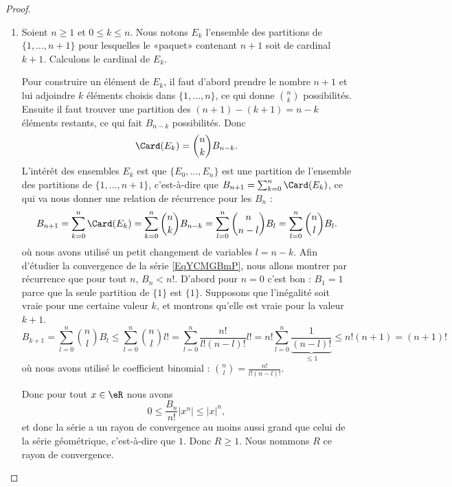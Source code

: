 \begin{proof}
	\begin{enumerate}
		\item
		      Soient \( n\geq 1\) et \( 0\leq k\leq n\). Nous notons \( E_k\) l'ensemble des partitions de \( \{ 1,\ldots, n+1 \}\) pour lesquelles le «paquet» contenant \( n+1\) soit de cardinal \( k+1\). Calculons le cardinal de \( E_k\).

		      Pour construire un élément de \( E_k\), il faut d'abord prendre le nombre \( n+1\) et lui adjoindre \( k\) éléments choisis dans \( \{ 1,\ldots, n \}\), ce qui donne \( n\choose k\) possibilités. Ensuite il faut trouver une partition des \( (n+1)-(k+1)=n-k\) éléments restants, ce qui fait \( B_{n-k}\) possibilités. Donc
		      \begin{equation}
			      \Card(E_k)={n\choose k}B_{n-k}.
		      \end{equation}
		      L'intérêt des ensembles \( E_k\) est que \( \{ E_0,\ldots, E_n \}\) est une partition de l'ensemble des partitions de \( \{ 1,\ldots, n+1 \}\), c'est-à-dire que \( B_{n+1}=\sum_{k=0}^n\Card(E_k)\), ce qui va nous donner une relation de récurrence pour les \( B_n\) :
		      \begin{equation}
			      B_{n+1}=\sum_{k=0}^n\Card(E_k)
			      =\sum_{k=0}^n{n\choose k}B_{n-k}
			      =\sum_{l=0}^n{n\choose n-l}B_l
			      =\sum_{l=0}^n{n\choose l}B_l.
		      \end{equation}
		      où nous avons utilisé un petit changement de variables \( l=n-k\). Afin d'étudier la convergence de la série \eqref{EqYCMGBmP}, nous allons montrer par récurrence que pour tout \( n\), \( B_n<n!\). D'abord pour \( n=0\) c'est bon : \( B_1=1\) parce que la seule partition de \( \{ 1 \}\) est \( \{ 1 \}\). Supposons que l'inégalité soit vraie pour une certaine valeur \( k\), et montrons qu'elle est vraie pour la valeur \( k+1\).
		      \begin{equation}
			      B_{k+1}=\sum_{l=0}^n{n\choose l}B_l
			      \leq \sum_{l=0}^n{n\choose l}l!
			      =\sum_{l=0}^n \frac{ n! }{ l!(n-l)! }l!=n!\sum_{l=0}^n\underbrace{\frac{ 1 }{ (n-l)! }}_{\leq 1}
			      \leq n!(n+1)
			      =(n+1)!
		      \end{equation}
		      où nous avons utilisé le coefficient binomial : \( {n\choose l}=\frac{ n! }{ l!(n-l)! }\).

		      Donc pour tout \( x\in \eR\) nous avons
		      \begin{equation}
			      0\leq \frac{ B_n }{ n! }| x^n |\leq | x |^n,
		      \end{equation}
		      et donc la série a un rayon de convergence au moins aussi grand que celui de la série géométrique, c'est-à-dire que \( 1\). Donc \( R\geq 1\). Nous nommons \( R\) ce rayon de convergence.


\end{enumerate}
\end{proof}
